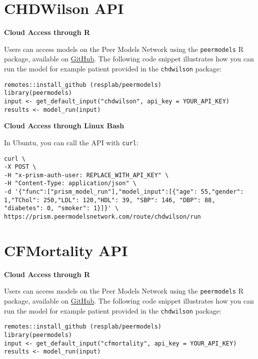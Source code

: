 \documentclass[
]{book}
\begin{document}
\hypertarget{chdwilson-api}{%
\section{CHDWilson API}\label{chdwilson-api}}

\textbf{Cloud Access through R}

Users can access models on the Peer Models Network using the \texttt{peermodels} R package, available on \href{https://github.com/resplab/peermodels}{GitHub}. The following code snippet illustrates how you can run the model for example patient provided in the \texttt{chdwilson} package:

\begin{verbatim}
remotes::install_github (resplab/peermodels)
library(peermodels)
input <- get_default_input("chdwilson", api_key = YOUR_API_KEY)
results <- model_run(input)
\end{verbatim}

\textbf{Cloud Access through Linux Bash}

In Ubuntu, you can call the API with \texttt{curl}:

\begin{verbatim}
curl \
-X POST \
-H "x-prism-auth-user: REPLACE_WITH_API_KEY" \
-H "Content-Type: application/json" \
-d '{"func":["prism_model_run"],"model_input":[{"age": 55,"gender": 1,"TChol": 250,"LDL": 120,"HDL": 39, "SBP": 146, "DBP": 88, "diabetes": 0, "smoker": 1}]}' \
https://prism.peermodelsnetwork.com/route/chdwilson/run
\end{verbatim}

\hypertarget{cfmortality-api}{%
\section{CFMortality API}\label{cfmortality-api}}

\textbf{Cloud Access through R}

Users can access models on the Peer Models Network using the \texttt{peermodels} R package, available on \href{https://github.com/resplab/peermodels}{GitHub}. The following code snippet illustrates how you can run the model for example patient provided in the \texttt{chdwilson} package:

\begin{verbatim}
remotes::install_github (resplab/peermodels)
library(peermodels)
input <- get_default_input("cfmortality", api_key = YOUR_API_KEY)
results <- model_run(input)
\end{verbatim}
\end{document}

